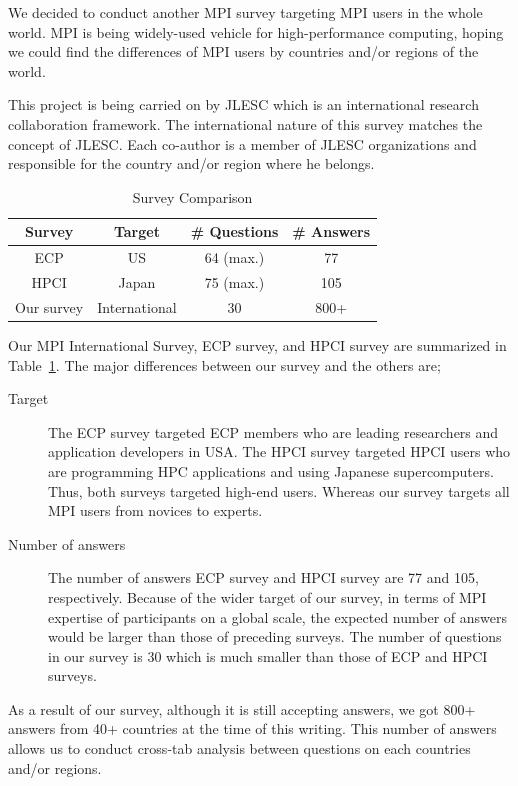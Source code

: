 \documentclass[submit,techrep,noauthor,english]{ipsj}
\begin{document}
We decided to conduct another MPI survey targeting MPI users in the
whole world. MPI is being widely-used vehicle for high-performance
computing, hoping we could find the differences of MPI users by
countries and/or regions of the world.

This project is being carried on by JLESC\cite{JLESC} which is an
international research collaboration framework. The international
nature of this survey matches the concept of JLESC. Each co-author is
a member of JLESC organizations and responsible for the country and/or
region where he belongs. 

\begin{table}[htb]%
\begin{center}%
\caption{Survey Comparison}\label{tab:comparison}%
\begin{tabular}{c|ccc}%
\hline%
Survey & Target & \# Questions & \# Answers \\%
\hline%
ECP  & US & 64 (max.) & 77 \\
HPCI & Japan & 75 (max.) & 105 \\
\hline
Our survey & International & 30 & 800+ \\
\hline%
\end{tabular}%
\end{center}%
\end{table}%

Our MPI International Survey, ECP survey, and HPCI survey are
summarized in Table~\ref{tab:comparison}. The major differences
between our survey and the others are;

\begin{description}
\item[Target]
  The ECP survey targeted ECP members who are leading researchers and
  application developers in USA. The HPCI survey targeted HPCI users
  who are programming HPC applications and using Japanese
  supercomputers. Thus, both surveys targeted high-end users. Whereas
  our survey targets all MPI users from novices to experts.
\item[Number of answers]
  The number of answers ECP survey and HPCI survey are 77 and 105,
  respectively. Because of the wider target of our survey, in terms of
  MPI expertise of participants on a global scale, the expected number of
  answers would be larger than those of preceding surveys. The number
  of questions in our survey is 30 which is much smaller than those of ECP
  and HPCI surveys.
\end{description}

As a result of our survey, although it is still accepting answers, we
got 800+ answers from 40+ countries at the time of this writing.  This
number of answers allows us to conduct cross-tab analysis between
questions on each countries and/or regions.
\end{document}
